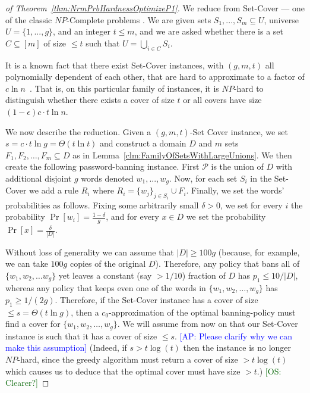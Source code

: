 \documentclass[prodmode,acmec]{ec-acmsmall}
\newcommand{\kibitz}[2]{\ifnum\Comments=1\textcolor{#1}{#2}\fi}
\newcommand{\ap}[1]{\kibitz{blue} {[AP: #1]}}
\newcommand{\os}[1]{\kibitz{darkgreen} {[OS: #1]}}
\begin{document}
\begin{proof}[of Theorem~\ref{thm:NrmPrbHardnessOptimizeP1}]
We reduce from Set-Cover --- one of the classic $NP$-Complete problems \cite{karp1972reducibility}. We are given sets $S_1,...,S_m \subseteq U$, universe $U = \{1,...,g\}$, and an integer $t \leq m$, and we are asked whether there is a set $C \subseteq [m]$ of size $\leq t$ such that $U = \bigcup_{i \in C} S_i$.

It is a known fact that there exist Set-Cover instances, with $(g,m,t)$ all polynomially dependent of each other, that are hard to approximate to a factor of $c\ln n$~\cite{AlonMS06}. That is, on this particular family of instances, it is $NP$-hard to distinguish whether there exists a cover of size $t$ or all covers have size $(1-\epsilon)c\cdot t\ln n$. 

We now describe the reduction. Given a $(g,m,t)$-Set Cover instance, we set $s = c\cdot t\ln g = \Theta(t\ln t)$ and construct a domain $D$ and $m$ sets $F_1, F_2, \ldots, F_m\subseteq D$ as in Lemma~\ref{clm:FamilyOfSetsWithLargeUnions}. We then create the following password-banning instance. First $\mathcal{P}$ is the union of $D$ with additional disjoint $g$ words denoted $w_1,...,w_g$. Now, for each set $S_i$ in the Set-Cover we add a rule $R_i$ where $R_i = \{w_j\}_{j\in S_i} \cup F_i$. Finally, we set the words' probabilities as follows. Fixing some arbitrarily small $\delta > 0$, we set for every $i$ the probability $\Pr[w_i] = \tfrac{1-\delta}{g}$, and for every $x\in D$ we set the probability $\Pr[x] = \tfrac \delta{|D|}$.

Without loss of generality we can assume that $|D| \geq 100 g$ (because, for example, we can take $100g$ copies of the original $D$). Therefore, any policy that bans all of $\{w_1, w_2, \ldots w_g\}$ yet leaves a constant (say $>1/10$) fraction of $D$ has $p_1 \leq 10/|D|$, whereas any policy that keeps even one of the words in $\{w_1, w_2, \ldots, w_g\}$ has $p_1 \geq 1/(2g)$. Therefore, if the Set-Cover instance has a cover of size $\leq s = \Theta(t\ln g)$, then a $c_0$-approximation of the optimal banning-policy must find a cover for $\{w_1, w_2, \ldots, w_g\}$. We will assume from now on that our Set-Cover instance is such that it has a cover of size $\leq s$. \ap{Please clarify why we can make this assumption} (Indeed, if $s > t\log(t)$ then the instance is no longer $NP$-hard, since the greedy algorithm must return a cover of size $>t \log(t)$ which causes us to deduce that the optimal cover must have size $>t$.) \os{Clearer?}


\end{proof}
\end{document}
